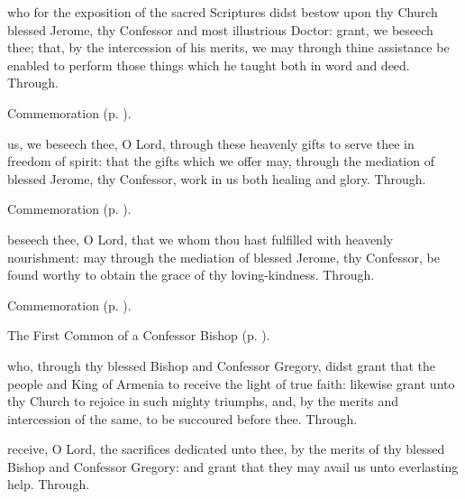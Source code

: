 \collect
{} who for the exposition of the sacred Scriptures didst bestow upon thy Church blessed Jerome, thy Confessor and most illustrious Doctor: grant, we beseech thee; that, by the intercession of his merits, we may through thine assistance be enabled to perform those things which he taught both in word and deed. Through.

\begin{rubric}
    Commemoration  (p. \pageref{ArmeniaCollect}).
\end{rubric}

\secret
{} us, we beseech thee, O Lord, through these heavenly gifts to serve thee in freedom of spirit: that the gifts which we offer may, through the mediation of blessed Jerome, thy Confessor, work in us both healing and glory. Through.

\begin{rubric}
    Commemoration  (p. \pageref{ArmeniaSecret}).
\end{rubric}

\postcommunion
{} beseech thee, O Lord, that we whom thou hast fulfilled with heavenly nourishment: may through the mediation of blessed Jerome, thy Confessor, be found worthy to obtain the grace of thy loving-kindness. Through.

\begin{rubric}
    Commemoration  (p. \pageref{ArmeniaPostcommunion}).
\end{rubric}



\begin{rubric}
	The First Common of a Confessor Bishop (p. \pageref{CommonConfessorBishopI}).
\end{rubric}

\collect\label{ArmeniaCollect}
 who, through thy blessed Bishop and Confessor Gregory, didst grant that the people and King of Armenia to receive the light of true faith: likewise grant unto thy Church to rejoice in such mighty triumphs, and, by the merits and intercession of the same, to be succoured before thee. Through.

\secret\label{ArmeniaSecret}
 receive, O Lord, the sacrifices dedicated unto thee, by the merits of thy blessed Bishop and Confessor Gregory: and grant that they may avail us unto everlasting help. Through.

